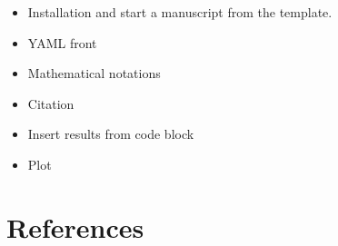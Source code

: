 \documentclass[
  man]{apa6}
\providecommand{\tightlist}{%
  \setlength{\itemsep}{0pt}\setlength{\parskip}{0pt}}
\begin{document}
\begin{itemize}
\tightlist
\item
  Installation and start a manuscript from the template.
\item
  YAML front
\item
  Mathematical notations
\item
  Citation
\item
  Insert results from code block
\item
  Plot
\end{itemize}

\newpage

\section{References}\label{references}
\end{document}
